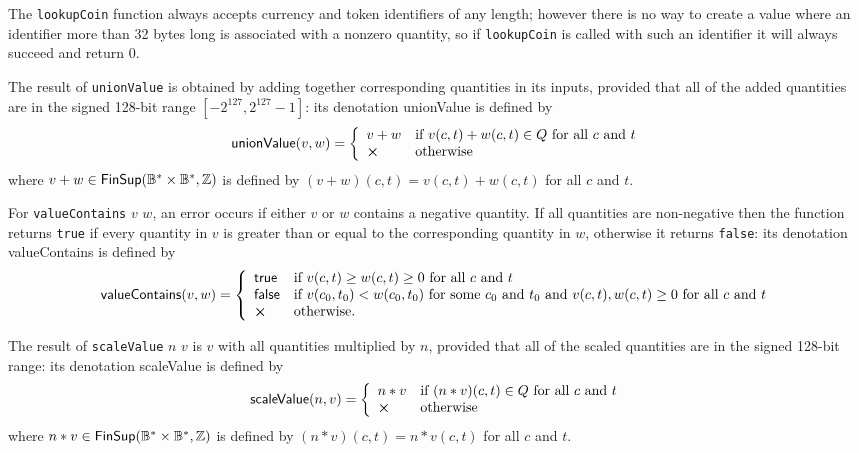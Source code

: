 \label{note:lookupCoin-semantics}
The \texttt{lookupCoin} function always accepts currency and token identifiers
of any length; however there is no way to create a value where an identifier
more than 32 bytes long is associated with a nonzero quantity, so
if \texttt{lookupCoin} is called with such an identifier it will always succeed
and return 0.

\label{note:unionValue-semantics}
The result of \texttt{unionValue} is obtained by adding together corresponding
quantities in its inputs, provided that all of the added quantities are in the
signed 128-bit range $[-2^{127}, 2^{127}-1]$: its denotation
\textsf{unionValue} is defined by
  $$
  \mathsf{unionValue}(v, w) =
  \left\{
  \begin{array}{ll}
        v+w & \text{if $v(c,t)+w(c,t) \in Q$ for all $c$ and $t$}\\
        \errorX & \text{otherwise}\\
  \end{array}\right.
  $$
where $v+w \in \mathsf{FinSup}(\mathbb{B}^* \times \mathbb{B}^*, \mathbb{Z})$ is defined by $(v+w)(c,t)
= v(c,t)+w(c,t)$ for all $c$ and $t$.

\label{note:valueContains-semantics}
For \texttt{valueContains} $v$ $w$, an error occurs if either $v$ or $w$
contains a negative quantity.  If all quantities are non-negative then the
function returns \texttt{true} if every quantity in $v$ is greater than or equal
to the corresponding quantity in $w$, otherwise it returns \texttt{false}: its
denotation
\textsf{valueContains} is defined by
  $$
  \mathsf{valueContains}(v,w)  =
  \left\{ \begin{array}{ll}
  \textsf{true} & \text{if  $v(c,t) \geq w(c,t) \geq 0$ for all $c$ and $t$}\\
  \textsf{false} & \text{if $v(c_0,t_0) < w(c_0,t_0)$ for some $c_0$ and $t_0$ and $v(c,t), w(c,t) \geq 0$ for all $c$ and $t$}\\
  \errorX & \text{otherwise.}\\
  \end{array}\right.
  $$

\label{note:scaleValue-semantics}
The result of \texttt{scaleValue} $n$ $v$ is $v$ with all quantities multiplied
by $n$, provided that all of the scaled quantities are in the signed 128-bit
range: its denotation
\textsf{scaleValue} is defined by
  $$
  \mathsf{scaleValue}(n,v) =
  \left\{
  \begin{array}{ll}
        n*v & \text{if $(n*v)(c,t) \in Q$ for all $c$ and $t$}\\
        \errorX & \text{otherwise}\\
  \end{array}\right.
  $$
  where $n*v \in \mathsf{FinSup}(\mathbb{B}^* \times \mathbb{B}^*, \mathbb{Z})$ is defined by
  $(n*v)(c,t) = n*v(c,t)$ for all $c$ and $t$.

